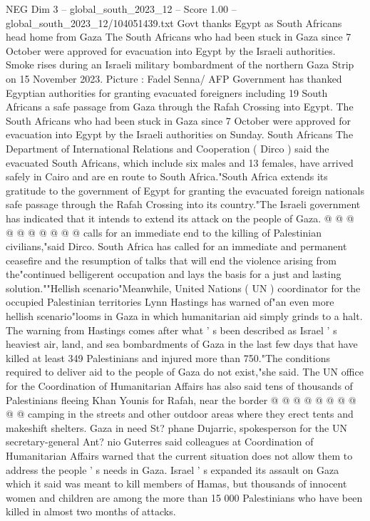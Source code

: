 \begin{textsample}{NEG Dim 3 – global\_south\_2023\_12 – Score 1.00 – global\_south\_2023\_12/104051439.txt}  \label{ex:f3_neg_004}
Govt thanks Egypt as South Africans head home from Gaza The South Africans who had been stuck in Gaza since 7 October were approved for evacuation into Egypt by the Israeli authorities.
Smoke rises during an Israeli military bombardment of the northern Gaza Strip on 15 November 2023.
Picture : Fadel Senna/ AFP Government has thanked Egyptian authorities for granting evacuated foreigners including 19 South Africans a safe passage from Gaza through the Rafah Crossing into Egypt.
The South Africans who had been stuck in Gaza since 7 October were approved for evacuation into Egypt by the Israeli authorities on Sunday.
South Africans The Department of International Relations and Cooperation ( Dirco ) said the evacuated South Africans, which include six males and 13 females, have arrived safely in Cairo and are en route to South Africa."South Africa extends its gratitude to the government of Egypt for granting the evacuated foreign nationals safe passage through the Rafah Crossing into its country."The Israeli government has indicated that it intends to extend its attack on the people of Gaza. @ @ @ @ @ @ @ @ @ @ calls for an immediate end to the killing of Palestinian civilians,"said Dirco.
South Africa has called for an immediate and permanent ceasefire and the resumption of talks that will end the violence arising from the"continued belligerent occupation and lays the basis for a just and lasting solution.""Hellish scenario"Meanwhile, United Nations ( UN ) coordinator for the occupied Palestinian territories Lynn Hastings has warned of"an even more hellish scenario"looms in Gaza in which humanitarian aid simply grinds to a halt.
The warning from Hastings comes after what ' s been described as Israel ' s heaviest air, land, and sea bombardments of Gaza in the last few days that have killed at least 349 Palestinians and injured more than 750."The conditions required to deliver aid to the people of Gaza do not exist,"she said.
The UN office for the Coordination of Humanitarian Affairs has also said tens of thousands of Palestinians fleeing Khan Younis for Rafah, near the border @ @ @ @ @ @ @ @ @ @ camping in the streets and other outdoor areas where they erect tents and makeshift shelters.
Gaza in need St? phane Dujarric, spokesperson for the UN secretary-general Ant? nio Guterres said colleagues at Coordination of Humanitarian Affairs warned that the current situation does not allow them to address the people ' s needs in Gaza.
Israel ' s expanded its assault on Gaza which it said was meant to kill members of Hamas, but thousands of innocent women and children are among the more than 15 000 Palestinians who have been killed in almost two months of attacks.

\end{textsample}
